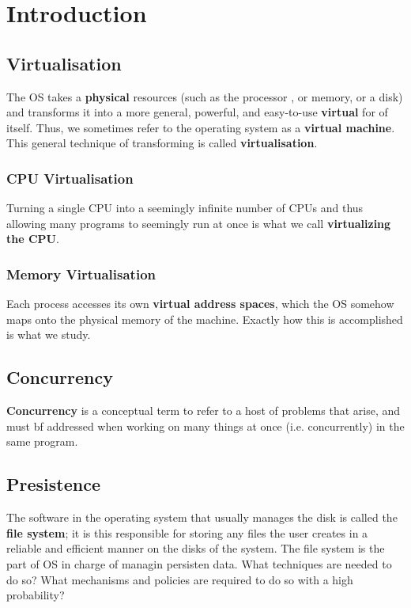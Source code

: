 \chapter{Introduction}

\section{Virtualisation}

The OS takes a \textbf{physical} resources (such as the processor
, or memory, or a disk) and transforms it into a more general,
powerful, and easy-to-use \textbf{virtual} for of itself. Thus,
we sometimes refer to the operating system as a \textbf{virtual
machine}. This general technique of transforming is called
\textbf{virtualisation}.

\subsection{CPU Virtualisation}

Turning a single CPU into a seemingly infinite number of CPUs and
thus allowing many programs to seemingly run at once is what
we call \textbf{virtualizing the CPU}.\\

\subsection{Memory Virtualisation}

Each process accesses its own \textbf{virtual address spaces}, which
the OS somehow maps onto the physical memory of the machine. Exactly
how this is accomplished is what we study.

\section{Concurrency}

\textbf{Concurrency} is a conceptual term to refer to a host of 
problems that arise, and must bf addressed when working on
many things at once (i.e. concurrently) in the same program.

\section{Presistence}

The software in the operating system that usually manages the disk
is called the \textbf{file system}; it is this
responsible for storing any
files the user creates in a reliable and efficient manner on the 
disks of the system. The file system is the part of OS in charge
of managin persisten data. What techniques are needed to do so? 
What mechanisms and policies are required to do so with a high
probability?

